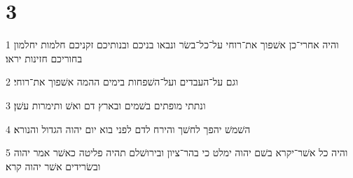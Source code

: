 \chapter{3}

\par 1 והיה אחרי־כן אשׁפוך את־רוחי על־כל־בשׂר ונבאו בניכם ובנותיכם זקניכם חלמות יחלמון בחוריכם חזינות יראו׃
\par 2 וגם על־העבדים ועל־השׁפחות בימים ההמה אשׁפוך את־רוחי׃
\par 3 ונתתי מופתים בשׁמים ובארץ דם ואשׁ ותימרות עשׁן׃
\par 4 השׁמשׁ יהפך לחשׁך והירח לדם לפני בוא יום יהוה הגדול והנורא׃
\par 5 והיה כל אשׁר־יקרא בשׁם יהוה ימלט כי בהר־ציון ובירושׁלם תהיה פליטה כאשׁר אמר יהוה ובשׂרידים אשׁר יהוה קרא׃


